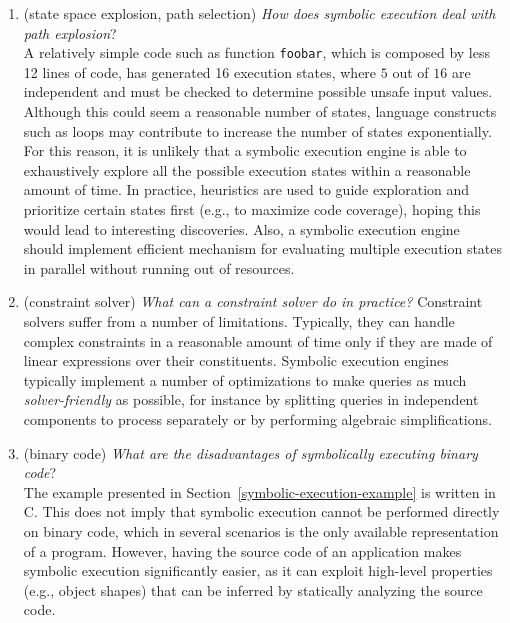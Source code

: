 \begin{enumerate}
  \item (state space explosion, path selection) {\em How does symbolic execution deal with path explosion}? \\
  A relatively simple code such as function {\tt foobar}, which is composed by less 12 lines of code, has generated 16 execution states, where $5$ out of $16$ are independent and must be checked to determine possible unsafe input values. Although this could seem a reasonable number of states, language constructs such as loops may contribute to increase the number of states exponentially. For this reason, it is unlikely that a symbolic execution engine is able to exhaustively explore all the possible execution states within a reasonable amount of time. In practice, heuristics are used to guide exploration and prioritize certain states first (e.g., to maximize code coverage), hoping this would lead to interesting discoveries. Also, a symbolic execution engine should implement efficient mechanism for evaluating multiple execution states in parallel without running out of resources.

  \item (constraint solver) {\em What can a constraint solver do in practice?}
 Constraint solvers suffer from a number of limitations. Typically, they can handle complex constraints in a reasonable amount of time only if they are made of linear expressions over their constituents. Symbolic execution engines typically implement a number of optimizations to make queries as much {\em solver-friendly} as possible, for instance by splitting queries in independent components to process separately or by performing algebraic simplifications.

  \item (binary code) {\em What are the disadvantages of symbolically executing binary code}? \\
  The example presented in Section~\ref{symbolic-execution-example} is written in C. This does not imply that symbolic execution cannot be performed directly on binary code, which in several scenarios is the only available representation of a program. However, having the source code of an application makes symbolic execution significantly easier, as it can exploit high-level properties (e.g., object shapes) that can be inferred by statically analyzing the source code.
   
\end{enumerate}
